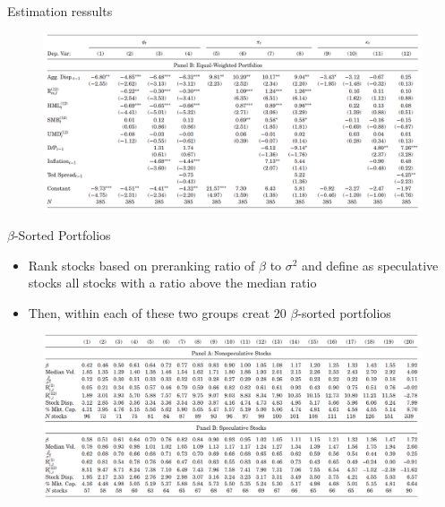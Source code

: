 \documentclass{beamer}
\begin{document}
\begin{frame}{Estimation ressults}
\begin{figure}
\centering
\includegraphics[width=0.85\linewidth]{t2}
\end{figure}
\end{frame}



\begin{frame}{$ \beta $-Sorted Portfolios}
\begin{itemize}
\item Rank stocks based on preranking ratio of $ \beta $ to $ \sigma^2 $ and define as speculative stocks all stocks with a ratio above  the  median ratio
\item Then, within each of these two groups creat 20 $ \beta $-sorted portfolios
\end{itemize}
\begin{figure}
\centering
\includegraphics[width=0.8\linewidth]{t3}
\end{figure}
\end{frame}
\end{document}
